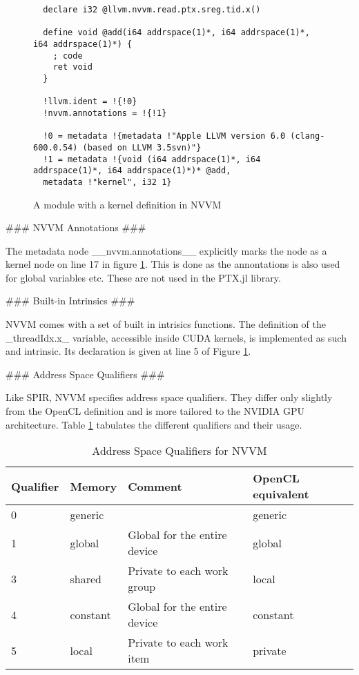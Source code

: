\begin{markdown}
\begin{figure}[H]
\begin{verbatim}
  declare i32 @llvm.nvvm.read.ptx.sreg.tid.x()
  
  define void @add(i64 addrspace(1)*, i64 addrspace(1)*, i64 addrspace(1)*) {
    ; code
    ret void
  }
  
  !llvm.ident = !{!0}
  !nvvm.annotations = !{!1}
  
  !0 = metadata !{metadata !"Apple LLVM version 6.0 (clang-600.0.54) (based on LLVM 3.5svn)"}
  !1 = metadata !{void (i64 addrspace(1)*, i64 addrspace(1)*, i64 addrspace(1)*)* @add,
  metadata !"kernel", i32 1}
  \end{verbatim}
  \caption{A module with a kernel definition in NVVM}
  \label{fig:nvvm}
\end{figure}

### NVVM Annotations ###

The metadata node __nvvm.annotations__ explicitly marks the node as a
kernel node on line 17 in figure \ref{fig:nvvm}. This is done as the
annontations is also used for global variables etc. These are not used
in the PTX.jl library.

### Built-in Intrinsics ###

\gls{NVVM} comes with a set of built in intrisics functions. The
definition of the _threadIdx.x_ variable, accessible inside \gls{CUDA}
kernels, is implemented as such and intrinsic. Its declaration is
given at line 5 of Figure \ref{fig:nvvm}.

### Address Space Qualifiers ###

Like \gls{SPIR}, \gls{NVVM} specifies address space qualifiers. They
differ only slightly from the OpenCL definition and is more tailored
to the NVIDIA GPU architecture. Table \ref{tab:nvvm:addr} tabulates
the different qualifiers and their usage.

\begin{table}[H]
  \centering
  \begin{tabular}{|l|l|l|l|}
    \hline
    Qualifier & Memory   & Comment                      & OpenCL equivalent \\
    \hline
0         & generic  &                   & generic  \\
1         & global   & Global for the entire device & global \\
3         & shared   & Private to each work group   & local \\
4         & constant & Global for the entire device & constant \\
5         & local    & Private to each work item    & private \\
    \hline
  \end{tabular}
  \caption{Address Space Qualifiers for NVVM}
  \label{tab:nvvm:addr}
\end{table}



\end{markdown}
